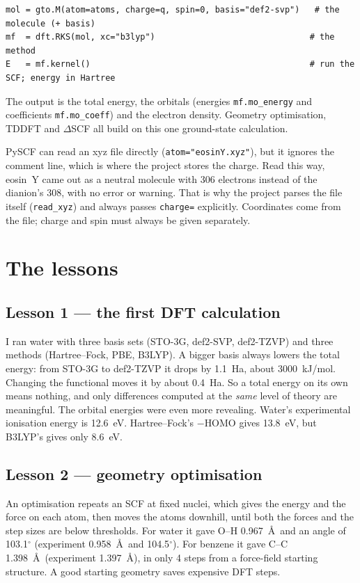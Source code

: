 \documentclass[11pt,a4paper]{article}
\begin{document}
\begin{lstlisting}
mol = gto.M(atom=atoms, charge=q, spin=0, basis="def2-svp")   # the molecule (+ basis)
mf  = dft.RKS(mol, xc="b3lyp")                               # the method
E   = mf.kernel()                                            # run the SCF; energy in Hartree
\end{lstlisting}

\noindent The output is the total energy, the orbitals (energies \texttt{mf.mo\_energy} and
coefficients \texttt{mf.mo\_coeff}) and the electron density. Geometry optimisation, TDDFT and
$\Delta$SCF all build on this one ground-state calculation.

\begin{pitfall}
PySCF can read an xyz file directly (\texttt{atom="eosinY.xyz"}), but it ignores the comment line,
which is where the project stores the charge. Read this way, eosin~Y came out as a neutral molecule
with 306 electrons instead of the dianion's 308, with no error or warning. That is why the project
parses the file itself (\texttt{read\_xyz}) and always passes \texttt{charge=} explicitly.
Coordinates come from the file; charge and spin must always be given separately.
\end{pitfall}

\section{The lessons}

\subsection*{Lesson 1 --- the first DFT calculation}
I ran water with three basis sets (STO-3G, def2-SVP, def2-TZVP) and three methods (Hartree--Fock,
PBE, B3LYP). A bigger basis always lowers the total energy: from STO-3G to def2-TZVP it drops by
1.1~Ha, about 3000~kJ/mol. Changing the functional moves it by about 0.4~Ha. So a total energy on
its own means nothing, and only differences computed at the \emph{same} level of theory are
meaningful. The orbital energies were even more revealing. Water's experimental ionisation energy
is 12.6~eV. Hartree--Fock's $-$HOMO gives 13.8~eV, but B3LYP's gives only 8.6~eV.

\subsection*{Lesson 2 --- geometry optimisation}
An optimisation repeats an SCF at fixed nuclei, which gives the energy and the force on each atom,
then moves the atoms downhill, until both the forces and the step sizes are below thresholds. For
water it gave O--H 0.967~\AA\ and an angle of 103.1$^\circ$ (experiment 0.958~\AA\ and
104.5$^\circ$). For benzene it gave C--C 1.398~\AA\ (experiment 1.397~\AA), in only 4 steps from a
force-field starting structure. A good starting geometry saves expensive DFT steps.
\end{document}
